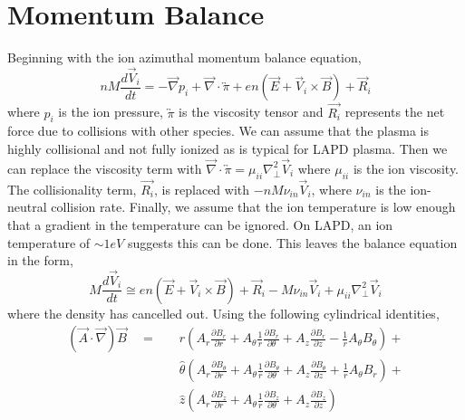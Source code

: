 \documentclass[aip,pop,amsmath,amssymb,preprint,superscriptaddress]{revtex4-1} %
\begin{document}
\section{Momentum Balance}

Beginning with the ion azimuthal momentum balance equation, 
\begin{equation}
nM\frac{d\vec{V}_{i}}{dt} = -\vec{\nabla}p_{i}+\vec{\nabla}\cdot \overleftrightarrow{\pi} + en(\vec{E}+\vec{V}_{i} \times \vec{B})+\vec{R}_{i}
\label{eq:mombalance1}
\end{equation}
where $p_{i}$ is the ion pressure, $\overleftrightarrow{\pi}$ is the viscosity tensor and $\vec{R_{i}}$ represents the net force due to collisions with other species. We can assume that the plasma is highly collisional and not fully ionized as is typical for LAPD plasma. Then we can replace the viscosity term with $\vec{\nabla}\cdot\overleftrightarrow{\pi} = \mu_{ii}\nabla_{\perp}^{2}\vec{V}_{i}$ where $\mu_{ii}$ is the ion viscosity. The collisionality term, $\vec{R_{i}}$, is replaced with $-nM\nu_{in}\vec{V}_{i}$, where $\nu_{in}$ is the ion-neutral collision rate. Finally, we assume that the ion temperature is low enough that a gradient in the temperature can be ignored. On LAPD, an ion temperature of $\sim 1eV$ suggests this can be done. This leaves the balance equation in the form,
\begin{equation}
M\frac{d\vec{V}_{i}}{dt} \cong en(\vec{E}+\vec{V}_{i} \times \vec{B})+\vec{R}_{i}-M\nu_{in}\vec{V}_{i}+\mu_{ii}\nabla_{\perp}^{2}\vec{V}_{i}
\label{eq:mombalance2}
\end{equation}
where the density has cancelled out. Using the following cylindrical identities,
\begin{equation}
\begin{split}
(\vec{A} \cdot \vec{\nabla})\vec{B}\quad =  &\quad \hat{r}\left( A_{r}\frac{\partial B_{r}}{\partial r}+A_{\theta}\frac{1}{r}\frac{\partial B_r}{\partial \theta}+A_z\frac{\partial B_r}{\partial z}-\frac{1}{r}A_{\theta}B_{\theta}\right)+\\ 
                                      &\quad \hat{\theta}\left(A_r\frac{\partial B_{\theta}}{\partial r}+A_{\theta}\frac{1}{r}\frac{\partial B_{\theta}}{\partial \theta}+A_z\frac{\partial B_{\theta}}{\partial z}+\frac{1}{r}A_{\theta}B_r\right)+\\
                                      &\quad \hat{z}\left(A_r\frac{\partial B_z}{\partial r}+A_{\theta}\frac{1}{r}\frac{\partial B_z}{\partial \theta}+A_z\frac{\partial B_z}{\partial z}\right)
\end{split}
\label{eq:cylderiv}
\end{equation}
\end{document}
